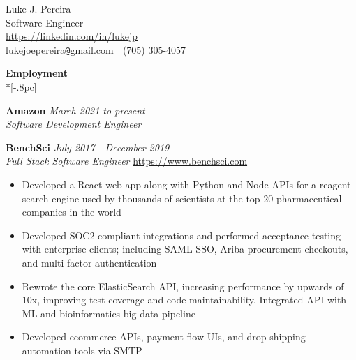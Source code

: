 \documentclass{article}
\begin{document}
\begin{center}
{\Large Luke J. Pereira} \\[.5pc]
Software Engineer \\[.2pc]
\url{https://linkedin.com/in/lukejp} \\[.2pc]
lukejoepereira\verb|@|gmail.com $\;$ (705) 305-4057\\[3pc]
\end{center}
\vspace{-25pt}

{\large \bf Employment} \\*[-.8pc]
\underline{\hspace{6.1in}}

{\bf Amazon } \hfill {\it March 2021 to present\/} \\
\textit{Software Development Engineer} \hfill

{\bf  BenchSci } \hfill {\it July 2017 - December 2019 \/} \\
\textit{Full Stack Software Engineer} \hfill \url{https://www.benchsci.com}
\begin{itemize}[leftmargin=*]
    \itemsep0em
    \renewcommand\labelitemi{\tiny$\bullet$}
    \item Developed a React web app along with Python and Node APIs for a reagent search engine used by thousands of scientists at the top 20 pharmaceutical companies in the world
    \item Developed SOC2 compliant integrations and performed acceptance testing  with enterprise clients; including SAML SSO, Ariba procurement checkouts, and multi-factor authentication
    \item Rewrote the core ElasticSearch API, increasing performance by upwards of 10x, improving test coverage and code maintainability. Integrated API with ML and bioinformatics big data pipeline
    \item Developed ecommerce APIs, payment flow UIs, and drop-shipping automation tools via SMTP
\end{itemize}
\end{document}
